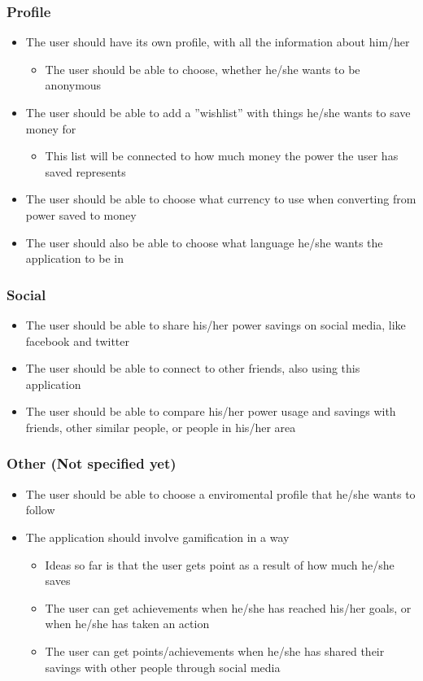 \begin{itemize}
\subsubsection{Profile}

\begin{itemize}
\item The user should have its own profile, with all the information about him/her
\begin{itemize}
\item The user should be able to choose, whether he/she wants to be anonymous
\end{itemize}
\item The user should be able to add a ''wishlist'' with things he/she wants to save money for
\begin{itemize}
\item This list will be connected to how much money the power the user has saved represents
\end{itemize}
\item The user should be able to choose what currency to use when converting from power saved to money
\item The user should also be able to choose what language he/she wants the application to be in
\end{itemize}


\subsubsection{Social}
\begin{itemize}
\item The user should be able to share his/her power savings on social media, like facebook and twitter
\item The user should be able to connect to other friends, also using this application
\item The user should be able to compare his/her power usage and savings with friends, other similar people, or people in his/her area
\end{itemize}

\subsubsection{Other (Not specified yet)}
\begin{itemize}
\item The user should be able to choose a enviromental profile that he/she wants to follow
\item The application should involve gamification in a way
\begin{itemize}
\item Ideas so far is that the user gets point as a result of how much he/she saves
\item The user can get achievements when he/she has reached his/her goals, or when he/she has taken an action
\item The user can get points/achievements when he/she has shared their savings with other people through social media
\end{itemize}
\end{itemize}



\end{itemize}
